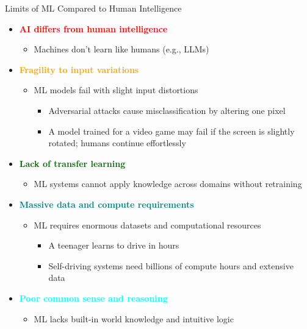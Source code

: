 \documentclass[
  10pt,
  ignorenonframetext,
]{beamer}
\providecommand{\tightlist}{%
  \setlength{\itemsep}{0pt}\setlength{\parskip}{0pt}}
\begin{document}
\begin{frame}{Limits of ML Compared to Human Intelligence}
\label{limits-of-ml-compared-to-human-intelligence}
\begin{itemize}
\tightlist
\item
  \textbf{\textcolor{red}{AI differs from human intelligence}}

  \begin{itemize}
  \tightlist
  \item
    Machines don't learn like humans (e.g., LLMs)
  \end{itemize}
\item
  \textbf{\textcolor{orange}{Fragility to input variations}}

  \begin{itemize}
  \tightlist
  \item
    ML models fail with slight input distortions

    \begin{itemize}
    \tightlist
    \item
      Adversarial attacks cause misclassification by altering one pixel
    \item
      A model trained for a video game may fail if the screen is
      slightly rotated; humans continue effortlessly
    \end{itemize}
  \end{itemize}
\item
  \textbf{\textcolor{darkgreen}{Lack of transfer learning}}

  \begin{itemize}
  \tightlist
  \item
    ML systems cannot apply knowledge across domains without retraining
  \end{itemize}
\item
  \textbf{\textcolor{teal}{Massive data and compute requirements}}

  \begin{itemize}
  \tightlist
  \item
    ML requires enormous datasets and computational resources

    \begin{itemize}
    \tightlist
    \item
      A teenager learns to drive in hours
    \item
      Self-driving systems need billions of compute hours and extensive
      data
    \end{itemize}
  \end{itemize}
\item
  \textbf{\textcolor{cyan}{Poor common sense and reasoning}}

  \begin{itemize}
  \tightlist
  \item
    ML lacks built-in world knowledge and intuitive logic
  \end{itemize}
\end{itemize}
\end{frame}
\end{document}
